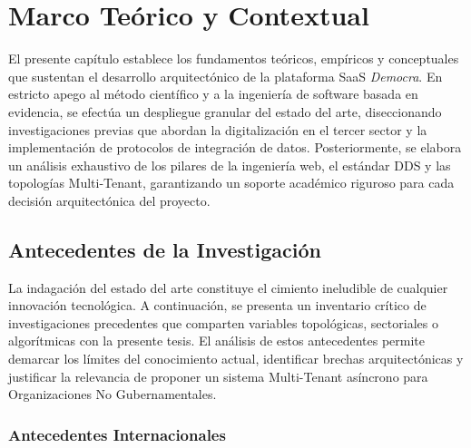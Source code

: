 \documentclass[11pt,a4paper,oneside]{report}
\begin{document}
\chapter{Marco Te\'orico y Contextual}
\label{chapter:marco}

El presente cap\'itulo establece los fundamentos te\'oricos, emp\'iricos y conceptuales que sustentan el desarrollo arquitect\'onico de la plataforma SaaS \textit{Democra}. En estricto apego al m\'etodo cient\'ifico y a la ingenier\'ia de software basada en evidencia, se efect\'ua un despliegue granular del estado del arte, diseccionando investigaciones previas que abordan la digitalizaci\'on en el tercer sector y la implementaci\'on de protocolos de integraci\'on de datos. Posteriormente, se elabora un an\'alisis exhaustivo de los pilares de la ingenier\'ia web, el est\'andar DDS y las topolog\'ias Multi-Tenant, garantizando un soporte acad\'emico riguroso para cada decisi\'on arquitect\'onica del proyecto.

\section{Antecedentes de la Investigaci\'on}
\label{sec:antecedentes}

La indagaci\'on del estado del arte constituye el cimiento ineludible de cualquier innovaci\'on tecnol\'ogica. A continuaci\'on, se presenta un inventario cr\'itico de investigaciones precedentes que comparten variables topol\'ogicas, sectoriales o algor\'itmicas con la presente tesis. El an\'alisis de estos antecedentes permite demarcar los l\'imites del conocimiento actual, identificar brechas arquitect\'onicas y justificar la relevancia de proponer un sistema Multi-Tenant as\'incrono para Organizaciones No Gubernamentales.

\subsection{Antecedentes Internacionales}
\end{document}
